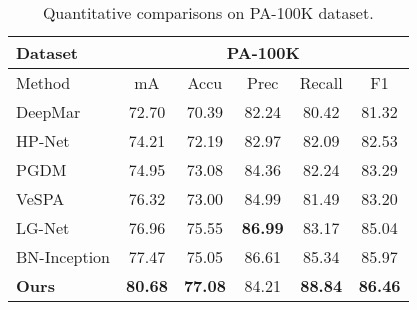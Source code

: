\documentclass[10pt,twocolumn,letterpaper]{article}
\begin{document}
\begin{table*}[t]
\begin{center}
\begin{tabular}{l|ccccc||ccccc|cc}
  \end{tabular}
  \end{center}
  \caption{Quantitative comparisons against previous methods on PETA and RAP datasets.
  We divide these methods into four groups: holistic methods, relation-based methods, attention-based methods, and part-based methods, from top to bottom.
   is the single model version of JRL.
  The precision and recall metrics are not so reliable in class-imbalanced datasets while the mA and F1 score are more convictive.
  Best results are in \textbf{bold}.
  For RAP dataset, we further provide comparisons on the number of parameters (\#P) and complexity (GFLOPs).
  }
  \label{Tab:peta-rap}
\end{table*}


\begin{table}[t]
  \begin{center}
  \small
  \begin{tabular}{l|ccccc}
    \hline
    Dataset &\multicolumn{5}{c}{PA-100K} \\ \hline
    Method &mA &Accu &Prec &Recall &F1 \\ \hline
    DeepMar \cite{deepmar} &72.70 &70.39 &82.24 &80.42 &81.32 \\
    HP-Net \cite{hpnet} &74.21 &72.19 &82.97 &82.09 &82.53 \\
    PGDM \cite{li2018pose} &74.95 &73.08 &84.36 &82.24 &83.29 \\
    VeSPA \cite{deepview} &76.32 &73.00 &84.99 &81.49 &83.20 \\
    LG-Net \cite{liu2018localization} &76.96 &75.55 &\textbf{86.99} &83.17 &85.04 \\ \hline\hline
    BN-Inception &77.47 &75.05 &86.61 &85.34 &85.97 \\
    \textbf{Ours} &\multicolumn{1}{c}{\textbf{80.68}} &\multicolumn{1}{c}{\textbf{77.08}} &\multicolumn{1}{c}{84.21} &\multicolumn{1}{c}{\textbf{88.84}} &\multicolumn{1}{c}{\textbf{86.46}} \\ \hline
  \end{tabular}
  \end{center}
  \caption{Quantitative comparisons on PA-100K dataset.}
  \vspace{-3mm}
  \label{Tab:pa100k}
\end{table}
\end{document}
